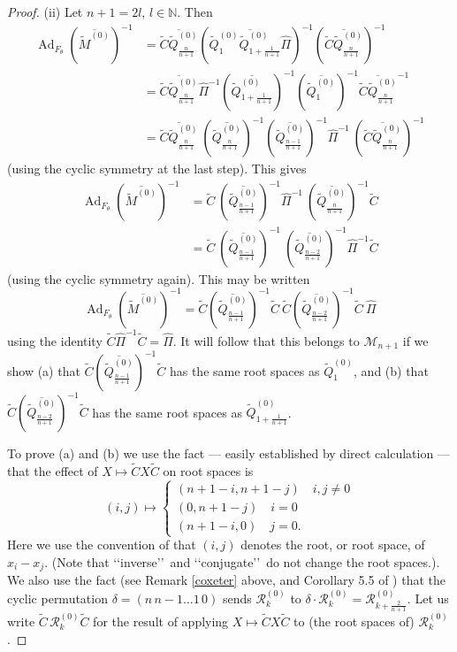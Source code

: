 \documentclass[a4paper,12pt,leqno]{amsart}
\numberwithin{equation}{section}
\theoremstyle{plain}
\theoremstyle{definition}
\newcommand{\N}{\mathbb N}
\newcommand{\de}{\delta}
\renewcommand{\th}{\theta}
\DeclareMathOperator{\Ad}{Ad}
\newcommand{\cR}{\mathcal{R}}
\newcommand{\cM}{\mathcal{M}}
\renewcommand{\ll}{\lq\lq}
\newcommand{\rr}{\rq\rq\ }
\newcommand{\tQz}{  \tilde Q^{(0)}  }
\newcommand{\tMz}{  \tilde M^{(0)}  }
\newcommand{\tC}{  \tilde C }
\newcommand{\cRz}{ \cR^{(0)}}
\begin{document}
\begin{proof}
(ii) Let $n+1=2l$, $l\in\N$. Then
\begin{align*}
\Ad_{F_\th} (\overline{\tMz  })^{-1}
&=
\overline{\tilde C\tQz_{ {\scriptstyle\frac{n}{n+1}}  } }
(\overline{\tQz_1\tQz_{1+ {\scriptstyle\frac{1}{n+1}}  }\hat\Pi}  )^{-1}
(\overline{\tilde C\tQz_{ {\scriptstyle\frac{n}{n+1}}  } })^{-1}
\\
&=
\overline{\tilde C\tQz_{ {\scriptstyle\frac{n}{n+1}}  } }
\hat\Pi^{-1}
(\overline{\tQz_{1+ {\scriptstyle\frac{1}{n+1}} } })^{-1}
(\overline{\tQz_1 })^{-1}
\overline{\tilde C\tQz_{ {\scriptstyle\frac{n}{n+1}}  } }^{-1}
\\
&=
\overline{\tilde C\tQz_{ {\scriptstyle\frac{n}{n+1}}  } }
\
(\overline{\tQz_{{\scriptstyle\frac{n}{n+1}} } })^{-1}
(\overline{\tQz_{{\scriptstyle\frac{n-1}{n+1}} } })^{-1} \hat\Pi^{-1}
\
(\overline{\tilde C\tQz_{ {\scriptstyle\frac{n}{n+1}}  } })^{-1}
\end{align*}
(using the cyclic symmetry at the last step).   This gives
\begin{align*}
\Ad_{F_\th} (\overline{\tMz  })^{-1}
&=
\tC
\
(\overline{\tQz_{{\scriptstyle\frac{n-1}{n+1}} } })^{-1} \hat\Pi^{-1}
\
(\overline{\tQz_{ {\scriptstyle\frac{n}{n+1}}  } })^{-1} \tilde C
\\
&=
\tC
\
(\overline{\tQz_{{\scriptstyle\frac{n-1}{n+1}} } })^{-1}
\
(\overline{\tQz_{ {\scriptstyle\frac{n-2}{n+1}}  } })^{-1}\hat\Pi^{-1} \tilde C
\end{align*}
(using the cyclic symmetry again).  This may be written
\[
\Ad_{F_\th} (\overline{\tMz  })^{-1}=
\tC (\overline{\tQz_{{\scriptstyle\frac{n-1}{n+1}} } })^{-1}\tC
\
\tC(\overline{\tQz_{{\scriptstyle\frac{n-2}{n+1}} } })^{-1}\tC
\
\hat\Pi
\]
using the identity $\tC \hat\Pi^{-1}\tC=\hat\Pi$.  It will follow that this belongs to $\cM_{n+1}$ if we show
(a) that $\tC (\overline{\tQz_{{\scriptstyle\frac{n-1}{n+1}} } })^{-1}\tC$
has the same root spaces as $\tQz_1$, and
(b) that $\tC(\overline{\tQz_{{\scriptstyle\frac{n-2}{n+1}} } })^{-1}\tC$
has the same root spaces as
$\tQz_{1+\scriptstyle\frac1{n+1}}$.

To prove (a) and (b) we use the fact --- easily established by direct calculation --- that the effect of $X\mapsto \tC X \tC$
on root spaces is
\[
(i,j)\mapsto
\begin{cases}
(n+1-i,n+1-j)\quad i,j\ne 0
\\
(0,n+1-j)\quad i= 0
\\
(n+1-i,0)\quad j= 0.
\end{cases}
\]
Here we use the convention of \cite{GH1} that $(i,j)$ denotes the root, or root space, of
$x_i-x_j$. (Note that \ll inverse\rr and \ll conjugate\rr do not change the root spaces.). We also use the fact (see Remark \ref{coxeter} above, and Corollary 5.5 of \cite{GH2}) that the
cyclic permutation $\de=(n \, n-1 \dots 1\, 0)$ sends
$\cRz_{k}$ to $\de\cdot \cRz_{k}=\cRz_{k+\scriptstyle\frac 2{n+1}}$.
Let us write $\tC \, \cRz_{k}\tC$ for the result of applying $X\mapsto \tC X \tC$
to (the root spaces of) $\cRz_{k}$.


\end{proof}
\end{document}
